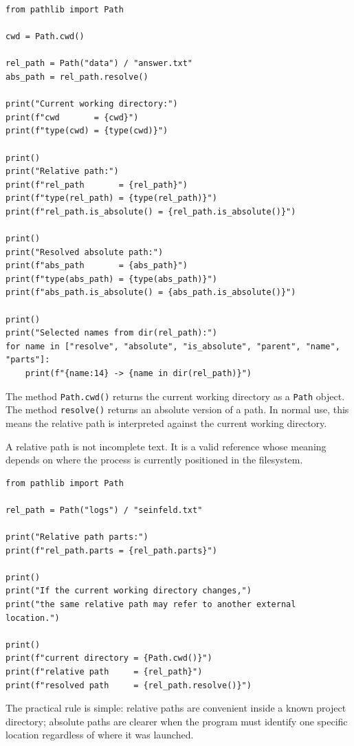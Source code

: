 \begin{verbatim}
from pathlib import Path

cwd = Path.cwd()

rel_path = Path("data") / "answer.txt"
abs_path = rel_path.resolve()

print("Current working directory:")
print(f"cwd       = {cwd}")
print(f"type(cwd) = {type(cwd)}")

print()
print("Relative path:")
print(f"rel_path       = {rel_path}")
print(f"type(rel_path) = {type(rel_path)}")
print(f"rel_path.is_absolute() = {rel_path.is_absolute()}")

print()
print("Resolved absolute path:")
print(f"abs_path       = {abs_path}")
print(f"type(abs_path) = {type(abs_path)}")
print(f"abs_path.is_absolute() = {abs_path.is_absolute()}")

print()
print("Selected names from dir(rel_path):")
for name in ["resolve", "absolute", "is_absolute", "parent", "name", "parts"]:
    print(f"{name:14} -> {name in dir(rel_path)}")
\end{verbatim}

The method \texttt{Path.cwd()} returns the current working directory as a \texttt{Path} object. The method \texttt{resolve()} returns an absolute version of a path. In normal use, this means the relative path is interpreted against the current working directory.

A relative path is not incomplete text. It is a valid reference whose meaning depends on where the process is currently positioned in the filesystem.

\begin{verbatim}
from pathlib import Path

rel_path = Path("logs") / "seinfeld.txt"

print("Relative path parts:")
print(f"rel_path.parts = {rel_path.parts}")

print()
print("If the current working directory changes,")
print("the same relative path may refer to another external location.")

print()
print(f"current directory = {Path.cwd()}")
print(f"relative path     = {rel_path}")
print(f"resolved path     = {rel_path.resolve()}")
\end{verbatim}

The practical rule is simple: relative paths are convenient inside a known project directory; absolute paths are clearer when the program must identify one specific location regardless of where it was launched.


